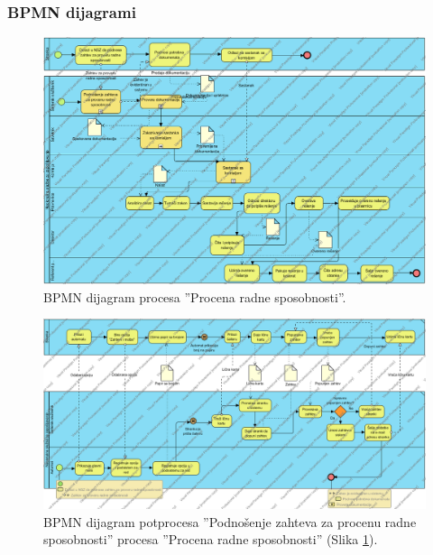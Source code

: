 \begin{mylandscape}
	\subsubsection{BPMN dijagrami}
	
	\begin{figure}[H]
		\centering
		\includegraphics[width=0.6\paperwidth]{dijagrami/bpmn-dijagrami/procena-radne-sposobnosti.png}
		\caption{BPMN dijagram procesa ''Procena radne sposobnosti''.}
		\label{bpmnd: procena radne sposobnosti}
	\end{figure}
	
	\newpage
	
	\begin{figure}[H]
		\centering
		\includegraphics[width=0.8\paperwidth]{dijagrami/bpmn-dijagrami/podnosenje-zahteva-za-procenu-radne-sposobnosti.png}
		\caption{BPMN dijagram potprocesa ''Podno\v senje zahteva za procenu radne sposobnosti'' procesa ''Procena radne sposobnosti'' (Slika \ref{bpmnd: procena radne sposobnosti}).}
	\end{figure}
	

\end{mylandscape}
